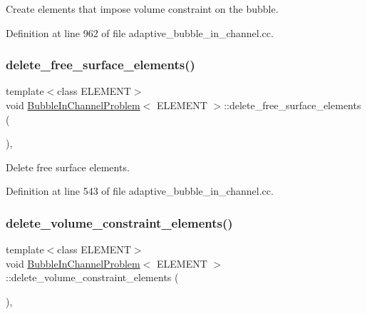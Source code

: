 Create elements that impose volume constraint on the bubble. 



Definition at line 962 of file adaptive\+\_\+bubble\+\_\+in\+\_\+channel.\+cc.

\mbox{\label{classBubbleInChannelProblem_af660f1a89b325e6da5d040f0abf837b0}} 
\subsubsection{\texorpdfstring{delete\+\_\+free\+\_\+surface\+\_\+elements()}{delete\_free\_surface\_elements()}}
{\footnotesize\ttfamily template$<$class E\+L\+E\+M\+E\+NT$>$ \\
void \hyperlink{classBubbleInChannelProblem}{Bubble\+In\+Channel\+Problem}$<$ E\+L\+E\+M\+E\+NT $>$\+::delete\+\_\+free\+\_\+surface\+\_\+elements (\begin{DoxyParamCaption}{ }\end{DoxyParamCaption})\hspace{0.3cm}{\ttfamily [inline]}, {\ttfamily [private]}}



Delete free surface elements. 



Definition at line 543 of file adaptive\+\_\+bubble\+\_\+in\+\_\+channel.\+cc.

\mbox{\label{classBubbleInChannelProblem_aecf64bacdf8735910d7dc7d747e1737a}} 
\subsubsection{\texorpdfstring{delete\+\_\+volume\+\_\+constraint\+\_\+elements()}{delete\_volume\_constraint\_elements()}}
{\footnotesize\ttfamily template$<$class E\+L\+E\+M\+E\+NT$>$ \\
void \hyperlink{classBubbleInChannelProblem}{Bubble\+In\+Channel\+Problem}$<$ E\+L\+E\+M\+E\+NT $>$\+::delete\+\_\+volume\+\_\+constraint\+\_\+elements (\begin{DoxyParamCaption}{ }\end{DoxyParamCaption})\hspace{0.3cm}{\ttfamily [inline]}, {\ttfamily [private]}}



